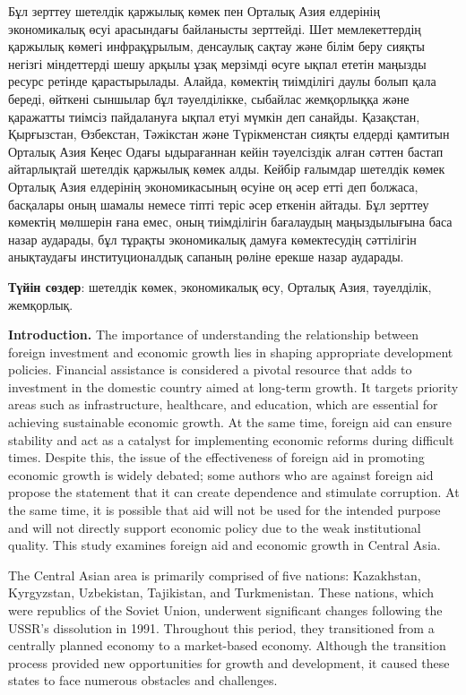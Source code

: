 Бұл зерттеу шетелдік қаржылық көмек пен Орталық Азия елдерінің
экономикалық өсуі арасындағы байланысты зерттейді. Шет мемлекеттердің
қаржылық көмегі инфрақұрылым, денсаулық сақтау және білім беру сияқты
негізгі міндеттерді шешу арқылы ұзақ мерзімді өсуге ықпал ететін маңызды
ресурс ретінде қарастырылады. Алайда, көмектің тиімділігі даулы болып
қала береді, өйткені сыншылар бұл тәуелділікке, сыбайлас жемқорлыққа
және қаражатты тиімсіз пайдалануға ықпал етуі мүмкін деп санайды.
Қазақстан, Қырғызстан, Өзбекстан, Тәжікстан және Түрікменстан сияқты
елдерді қамтитын Орталық Азия Кеңес Одағы ыдырағаннан кейін тәуелсіздік
алған сәттен бастап айтарлықтай шетелдік қаржылық көмек алды. Кейбір
ғалымдар шетелдік көмек Орталық Азия елдерінің экономикасының өсуіне оң
әсер етті деп болжаса, басқалары оның шамалы немесе тіпті теріс әсер
еткенін айтады. Бұл зерттеу көмектің мөлшерін ғана емес, оның
тиімділігін бағалаудың маңыздылығына баса назар аударады, бұл тұрақты
экономикалық дамуға көмектесудің сәттілігін анықтаудағы институционалдық
сапаның рөліне ерекше назар аударады.

{\bfseries Түйін сөздер}: шетелдік көмек, экономикалық өсу, Орталық Азия,
тәуелділік, жемқорлық.

{\bfseries Introduction.} The importance of understanding the relationship
between foreign investment and economic growth lies in shaping
appropriate development policies. Financial assistance is considered a
pivotal resource that adds to investment in the domestic country aimed
at long-term growth. It targets priority areas such as infrastructure,
healthcare, and education, which are essential for achieving sustainable
economic growth. At the same time, foreign aid can ensure stability and
act as a catalyst for implementing economic reforms during difficult
times. Despite this, the issue of the effectiveness of foreign aid in
promoting economic growth is widely debated; some authors who are
against foreign aid propose the statement that it can create dependence
and stimulate corruption. At the same time, it is possible that aid will
not be used for the intended purpose and will not directly support
economic policy due to the weak institutional quality. This study
examines foreign aid and economic growth in Central Asia.~

The Central Asian area is primarily comprised of five nations:
Kazakhstan, Kyrgyzstan, Uzbekistan, Tajikistan, and Turkmenistan. These
nations, which were republics of the Soviet Union, underwent significant
changes following the USSR's dissolution in 1991. Throughout this
period, they transitioned from a centrally planned economy to a
market-based economy. Although the transition process provided new
opportunities for growth and development, it caused these states to face
numerous obstacles and challenges.

